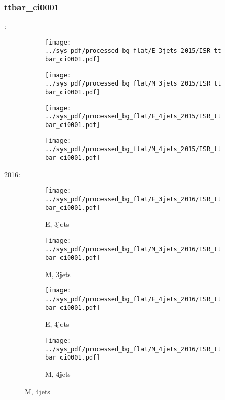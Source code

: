 \documentclass{beamer}
\begin{document}
\begin{frame}
\frametitle{ttbar_ci0001}
\fontsize{5}{1}:
\begin{figure}
\centering
\begin{subfigure}[b]{0.24\textwidth}
\texttt{[image: ../sys\_pdf/processed\_bg\_flat/E\_3jets\_2015/ISR\_ttbar\_ci0001.pdf]}
\end{subfigure}
\begin{subfigure}[b]{0.24\textwidth}
\texttt{[image: ../sys\_pdf/processed\_bg\_flat/M\_3jets\_2015/ISR\_ttbar\_ci0001.pdf]}
\end{subfigure}
\begin{subfigure}[b]{0.24\textwidth}
\texttt{[image: ../sys\_pdf/processed\_bg\_flat/E\_4jets\_2015/ISR\_ttbar\_ci0001.pdf]}
\end{subfigure}
\begin{subfigure}[b]{0.24\textwidth}
\texttt{[image: ../sys\_pdf/processed\_bg\_flat/M\_4jets\_2015/ISR\_ttbar\_ci0001.pdf]}
\end{subfigure}
\end{figure}
2016:
\begin{figure}
\centering
\begin{subfigure}[b]{0.24\textwidth}
\texttt{[image: ../sys\_pdf/processed\_bg\_flat/E\_3jets\_2016/ISR\_ttbar\_ci0001.pdf]}
\captionsetup{font=tiny}
\caption{E, 3jets}
\end{subfigure}
\begin{subfigure}[b]{0.24\textwidth}
\texttt{[image: ../sys\_pdf/processed\_bg\_flat/M\_3jets\_2016/ISR\_ttbar\_ci0001.pdf]}
\captionsetup{font=tiny}
\caption{M, 3jets}
\end{subfigure}
\begin{subfigure}[b]{0.24\textwidth}
\texttt{[image: ../sys\_pdf/processed\_bg\_flat/E\_4jets\_2016/ISR\_ttbar\_ci0001.pdf]}
\captionsetup{font=tiny}
\caption{E, 4jets}
\end{subfigure}
\begin{subfigure}[b]{0.24\textwidth}
\texttt{[image: ../sys\_pdf/processed\_bg\_flat/M\_4jets\_2016/ISR\_ttbar\_ci0001.pdf]}
\captionsetup{font=tiny}
\caption{M, 4jets}
\end{subfigure}
\end{figure}
\end{frame}
\end{document}
